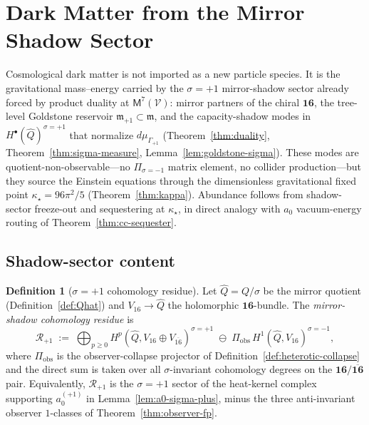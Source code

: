\documentclass[11pt]{article}
\theoremstyle{plain}
\theoremstyle{definition}
\newtheorem{definition}[theorem]{Definition}
\theoremstyle{remark}
\numberwithin{equation}{section}
\newcommand{\Void}{\mathcal{V}}
\newcommand{\Mirror}{\mathsf{M}}
\begin{document}
\section{Dark Matter from the Mirror Shadow Sector}
\label{sec:dark-sector}

Cosmological dark matter is not imported as a new particle species. It is the
gravitational mass--energy carried by the $\sigma=+1$ mirror-shadow sector
already forced by product duality at $\Mirror^7(\Void)$: mirror partners of the
chiral $\mathbf{16}$, the tree-level Goldstone reservoir
$\mathfrak{m}_{+1}\subset\mathfrak{m}$, and the capacity-shadow modes in
$H^\bullet(\hat Q)^{\sigma=+1}$ that normalize $d\mu_{\Gamma_{+1}}$
(Theorem~\ref{thm:duality}, Theorem~\ref{thm:sigma-measure},
Lemma~\ref{lem:goldstone-sigma}). These modes are quotient-non-observable---no
$\Pi_{\sigma=-1}$ matrix element, no collider production---but they source the
Einstein equations through the dimensionless gravitational fixed point
$\kappa_\star=96\pi^2/5$ (Theorem~\ref{thm:kappa}). Abundance follows from
shadow-sector freeze-out and sequestering at $\kappa_\star$, in direct analogy
with $a_0$ vacuum-energy routing of Theorem~\ref{thm:cc-sequester}.

\subsection{Shadow-sector content}
\label{sec:dark-sector:content}

\begin{definition}[$\sigma=+1$ cohomology residue]\label{def:dm-residue}
Let $\hat Q=Q/\sigma$ be the mirror quotient
(Definition~\ref{def:Qhat}) and $V_{16}\to\hat Q$ the holomorphic
$\mathbf{16}$-bundle. The \emph{mirror-shadow cohomology residue} is
\begin{equation}\label{eq:dm-residue}
  \mathcal{R}_{+1}
  \;:=\;
  \bigoplus_{p\geq 0}
  H^p(\hat Q, V_{16}\oplus V_{\overline{16}})^{\sigma=+1}
  \;\ominus\;
  \Pi_{\mathrm{obs}}\,H^1(\hat Q,V_{16})^{\sigma=-1},
\end{equation}
where $\Pi_{\mathrm{obs}}$ is the observer-collapse projector of
Definition~\ref{def:heterotic-collapse} and the direct sum is taken over all
$\sigma$-invariant cohomology degrees on the $\mathbf{16}/\overline{\mathbf{16}}$
pair. Equivalently, $\mathcal{R}_{+1}$ is the $\sigma=+1$ sector of the
heat-kernel complex supporting $a_0^{(+1)}$ in
Lemma~\ref{lem:a0-sigma-plus}, minus the three anti-invariant observer
$1$-classes of Theorem~\ref{thm:observer-fp}.
\end{definition}
\end{document}
